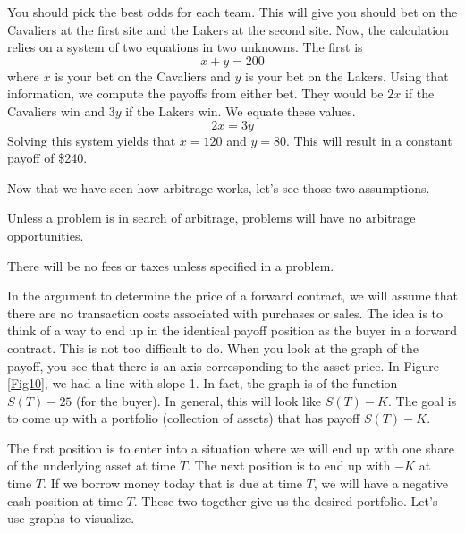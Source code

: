 \documentclass{ximera}
\begin{document}
\begin{solution}
You should pick the best odds for each team. This will give you should bet on the Cavaliers at the first site and the Lakers at the second site. Now, the calculation relies on a system of two equations in two unknowns. The first is
	\begin{equation*}
	x+y=200
	\end{equation*}
where $x$ is your bet on the Cavaliers and $y$ is your bet on the Lakers. Using that information, we compute the payoffs from either bet. They would be $2x$ if the Cavaliers win and $3y$ if the Lakers win. We equate these values.
	\begin{equation*}
	2x=3y
	\end{equation*}
Solving this system yields that $x=120$ and $y=80$. This will result in a constant payoff of \$240.
\end{solution}

Now that we have seen how arbitrage works, let's see those two assumptions.

\begin{ass}\label{ass5} Unless a problem is in search of arbitrage, problems will have no arbitrage opportunities.
\end{ass}

\begin{ass}\label{ass6} There will be no fees or taxes unless specified in a problem.
\end{ass}

In the argument to determine the price of a forward contract, we will assume that there are no transaction costs associated with purchases or sales. The idea is to think of a way to end up in the identical payoff position as the buyer in a forward contract. This is not too difficult to do. When you look at the graph of the payoff, you see that there is an axis corresponding to the asset price. In Figure \ref{Fig10}, we had a line with slope 1. In fact, the graph is of the function $S(T)-25$ (for the buyer). In general, this will look like $S(T)-K$. The goal is to come up with a portfolio (collection of assets) that has payoff $S(T)-K$. 

The first position is to enter into a situation where we will end up with one share of the underlying asset at time $T$. The next position is to end up with $-K$ at time $T$. If we borrow money today that is due at time $T$, we will have a negative cash position at time $T$. These two together give us the desired portfolio. Let's use graphs to visualize.
\end{document}
